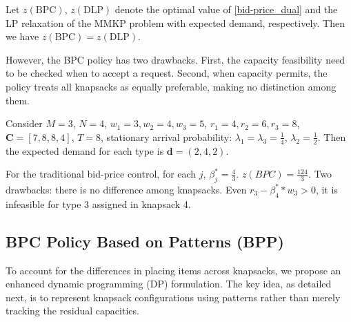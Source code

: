 



Let $z(\text{BPC})$, $z(\text{DLP})$ denote the optimal value of \eqref{bid-price_dual} and the LP relaxation of the \textup{MMKP} problem with expected demand, respectively. Then we have $z(\text{BPC}) = z(\text{DLP})$.

However, the BPC policy has two drawbacks. First, the capacity feasibility need to be checked when to accept a request. Second, when capacity permits, the policy treats all knapsacks as equally preferable, making no distinction among them.

\begin{example}
Consider $M =3$, $N =4$, $w_{1} = 3, w_{2} = 4, w_{3} = 5$, $r_{1} = 4, r_{2} = 6, r_{3} = 8$, $\bm{C} = [7, 8, 8, 4]$, $T = 8$, stationary arrival probability: $\lambda_{1} = \lambda_{3} = \frac{1}{4}$, $\lambda_{2} = \frac{1}{2}$. Then the expected demand for each type is $\bm{d} = (2, 4, 2)$.

For the traditional bid-price control, for each $j$, $\beta_{j}^{*} = \frac{4}{3}$. $z(BPC) = \frac{124}{3}$. Two drawbacks: there is no difference among knapsacks. Even $r_{3} - \beta_{4}^{*} * w_{3} > 0$, it is infeasible for type 3 assigned in knapsack 4.
\end{example}

\subsection{BPC Policy Based on Patterns (BPP)}
To account for the differences in placing items across knapsacks, we propose an enhanced dynamic programming (DP) formulation. The key idea, as detailed next, is to represent knapsack configurations using patterns rather than merely tracking the residual capacities.

